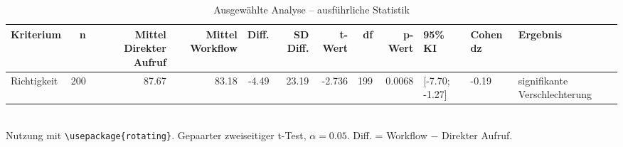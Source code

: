 \begin{table}
\centering
\caption{Ausgewählte Analyse -- ausführliche Statistik}
\begin{tabular}{lrrrrrrrrlll}
\toprule
Kriterium & n & Mittel Direkter Aufruf & Mittel Workflow & Diff. & SD Diff. & t-Wert & df & p-Wert & 95\% KI & Cohen dz & Ergebnis \\
\midrule
Richtigkeit & 200 & 87.67 & 83.18 & -4.49 & 23.19 & -2.736 & 199 & 0.0068 & [-7.70; -1.27] & -0.19 & signifikante Verschlechterung \\
\bottomrule
\end{tabular}
\\[2mm]
\footnotesize Nutzung mit \texttt{\textbackslash usepackage\{rotating\}}. Gepaarter zweiseitiger t-Test, $\alpha=0.05$. Diff. = Workflow $-$ Direkter Aufruf.
\end{table}
